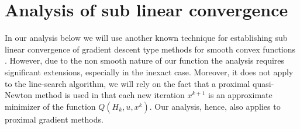 \documentclass[11pt]{article}
\numberwithin{equation}{section}
\begin{document}
\section{Analysis of sub linear convergence}\label{sec:complete_conv}
In our analysis below we will use another known technique for establishing sub linear convergence of  gradient descent type methods
for smooth convex functions \cite{Cartisetal2012}. However, due to the non smooth nature of our function the analysis requires significant extensions,
especially in the inexact case. Moreover, it does not apply to the line-search algorithm, we will rely on the fact that a proximal quasi-Newton method is used in that each new iteration $x^{k+1}$ is an approximate minimizer of the function $Q(H_k, u, x^k)$. Our analysis, hence, also applies to proximal gradient methods. 
\end{document}
